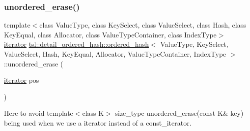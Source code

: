 \subsubsection{\texorpdfstring{unordered\_erase()}{unordered\_erase()}\hspace{0.1cm}{\footnotesize\ttfamily [1/2]}}
{\footnotesize\ttfamily template$<$class Value\+Type, class Key\+Select, class Value\+Select, class Hash, class Key\+Equal, class Allocator, class Value\+Type\+Container, class Index\+Type$>$ \\
\mbox{\hyperlink{classtsl_1_1detail__ordered__hash_1_1ordered__hash_1_1ordered__iterator}{iterator}} \mbox{\hyperlink{classtsl_1_1detail__ordered__hash_1_1ordered__hash}{tsl\+::detail\+\_\+ordered\+\_\+hash\+::ordered\+\_\+hash}}$<$ Value\+Type, Key\+Select, Value\+Select, Hash, Key\+Equal, Allocator, Value\+Type\+Container, Index\+Type $>$\+::unordered\+\_\+erase (\begin{DoxyParamCaption}\item[{\mbox{\hyperlink{classtsl_1_1detail__ordered__hash_1_1ordered__hash_1_1ordered__iterator}{iterator}}}]{pos }\end{DoxyParamCaption})\hspace{0.3cm}{\ttfamily [inline]}}

Here to avoid {\ttfamily template$<$class K$>$ size\+\_\+type unordered\+\_\+erase(const K\& key)} being used when we use a iterator instead of a const\+\_\+iterator. \mbox{\label{classtsl_1_1detail__ordered__hash_1_1ordered__hash_a46db26df8d9104bf7b9dc80fe10101e9}} 
